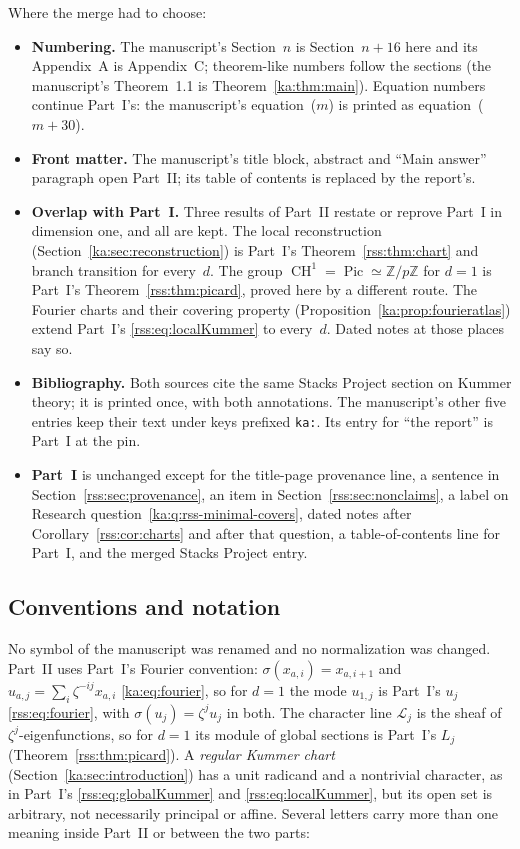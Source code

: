 \documentclass[11pt,a4paper]{article}
\theoremstyle{definition}
\theoremstyle{remark}
\newcommand{\Z}{\mathbb Z}
\newcommand{\Pic}{\operatorname{Pic}}
\newcommand{\code}[1]{{\small\nolinkurl{#1}}}
\newcommand{\LL}{\mathcal L}
\newcommand{\CH}{\operatorname{CH}}
\begin{document}
Where the merge had to choose:
\begin{itemize}
\item \textbf{Numbering.} The manuscript's Section~$n$ is Section~$n+16$
here and its Appendix~A is Appendix~C; theorem-like numbers follow the
sections (the manuscript's Theorem~1.1 is Theorem~\ref{ka:thm:main}). Equation
numbers continue Part~I's: the manuscript's equation~($m$) is printed as
equation~($m+30$).
\item \textbf{Front matter.} The manuscript's title block, abstract and
``Main answer'' paragraph open Part~II; its table of contents is replaced by
the report's.
\item \textbf{Overlap with Part~I.} Three results of Part~II restate or
reprove Part~I in dimension one, and all are kept. The local reconstruction
(Section~\ref{ka:sec:reconstruction}) is Part~I's Theorem~\ref{rss:thm:chart}
and branch transition for every~$d$. The group $\CH^1=\Pic\simeq\Z/p\Z$ for
$d=1$ is Part~I's Theorem~\ref{rss:thm:picard}, proved here by a different
route. The Fourier charts and their covering property
(Proposition~\ref{ka:prop:fourieratlas}) extend Part~I's
\eqref{rss:eq:localKummer} to every~$d$. Dated notes at those places say so.
\item \textbf{Bibliography.} Both sources cite the same Stacks Project
section on Kummer theory; it is printed once, with both annotations. The
manuscript's other five entries keep their text under keys prefixed
\code{ka:}. Its entry for ``the report'' is Part~I at the pin.
\item \textbf{Part~I} is unchanged except for the title-page provenance
line, a sentence in Section~\ref{rss:sec:provenance}, an item in
Section~\ref{rss:sec:nonclaims}, a label on Research
question~\ref{ka:q:rss-minimal-covers}, dated notes after
Corollary~\ref{rss:cor:charts} and after that question, a table-of-contents
line for Part~I, and the merged Stacks Project entry.
\end{itemize}

\subsection{Conventions and notation}
\label{ka:sec:notation}

No symbol of the manuscript was renamed and no normalization was changed.
Part~II uses Part~I's Fourier convention: $\sigma(x_{a,i})=x_{a,i+1}$ and
$u_{a,j}=\sum_i\zeta^{-ij}x_{a,i}$ \eqref{ka:eq:fourier}, so for $d=1$ the
mode $u_{1,j}$ is Part~I's $u_j$ \eqref{rss:eq:fourier}, with
$\sigma(u_j)=\zeta^ju_j$ in both. The character line $\LL_j$ is the sheaf of
$\zeta^j$-eigenfunctions, so for $d=1$ its module of global sections is
Part~I's $L_j$ (Theorem~\ref{rss:thm:picard}). A \emph{regular Kummer chart}
(Section~\ref{ka:sec:introduction}) has a unit radicand and a nontrivial
character, as in Part~I's \eqref{rss:eq:globalKummer} and
\eqref{rss:eq:localKummer}, but its open set is arbitrary, not necessarily
principal or affine. Several letters carry more than one meaning inside
Part~II or between the two parts:
\end{document}
